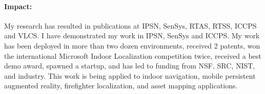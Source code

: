 \documentclass[11pt]{article}
\begin{document}

\paragraph{Impact: }
My research has resulted in publications at IPSN, SenSys, RTAS, RTSS, ICCPS and VLCS. I have demonstrated my work in IPSN, SenSys and ICCPS. My work has been deployed in more than two dozen environments, received 2 patents, won the international
Microsoft Indoor Localization competition twice, received a best demo
award, spawned a startup, and has led to funding from NSF, SRC, NIST, and
industry. This work is being applied to indoor navigation, mobile
persistent augmented reality, firefighter localization, and asset
mapping applications.
\end{document}
